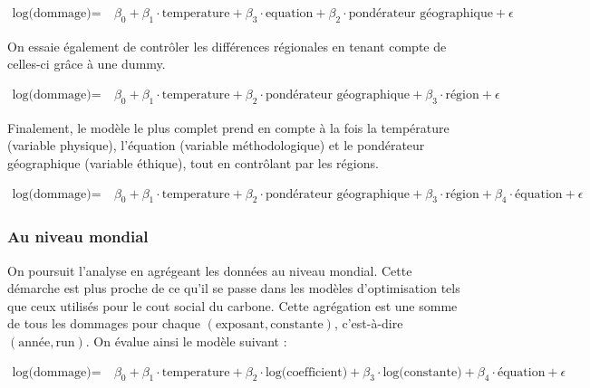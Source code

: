 \begin{align}
\text{log(dommage)} = & \ \beta_0  + \beta_1 \cdot \text{temperature}  + \beta_3 \cdot \text{equation} + 
 \beta_2 \cdot \text{pondérateur géographique}  + \epsilon
\end{align}

On essaie également de contrôler les différences régionales en tenant compte de celles-ci grâce à une dummy. 

\begin{align}
\text{log(dommage)} = & \ \beta_0  + \beta_1 \cdot \text{temperature}  + \beta_2 \cdot \text{pondérateur géographique} + \beta_3 \cdot \text{région} + \epsilon
\end{align}

Finalement, le modèle le plus complet prend en compte à la fois la température (variable physique), l'équation (variable méthodologique) et le pondérateur géographique (variable éthique), tout en contrôlant par les régions. 

\begin{align}
\text{log(dommage)} = & \ \beta_0  + \beta_1 \cdot \text{temperature}  + \beta_2 \cdot \text{pondérateur géographique} + \beta_3 \cdot \text{région} + \beta_4 \cdot \text{équation} + \epsilon
\end{align}

\subsubsection{Au niveau mondial}

On poursuit l'analyse en agrégeant les données au niveau mondial. Cette démarche est plus proche de ce qu'il se passe dans les modèles d'optimisation tels que ceux utilisés pour le \gls{cout social du carbone}. Cette agrégation est une somme de tous les dommages pour chaque $ (\text{exposant}, \text{constante}) $, c'est-à-dire $ (\text{année}, \text{run}) $. On évalue ainsi le modèle suivant : 

\begin{align}
\text{log(dommage)} = & \ \beta_0  + \beta_1 \cdot \text{temperature}  + \beta_2 \cdot \text{log(coefficient)} + \beta_3 \cdot \text{log(constante)} + \beta_4 \cdot \text{équation} + \epsilon
\end{align}


